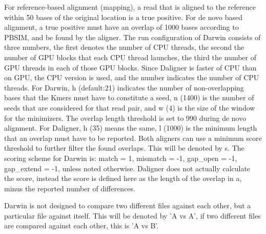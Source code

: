 \documentclass[../thesis.tex]{subfiles}
\begin{document}
For reference-based alignment (mapping), a read that is aligned to the reference within 50 bases of the original location is a true positive.
For de novo based alignment, a true positive must have an overlap of 1000 bases according to PBSIM, and be found by the aligner.
The run configuration of Darwin consists of three numbers, the first denotes the number of CPU threads, the second the number of GPU blocks that each CPU thread launches, the third the number of GPU threads in each of those GPU blocks.
Since Daligner is faster of CPU than on GPU, the CPU version is used, and the number indicates the number of CPU threads.
For Darwin, h (default:21) indicates the number of non-overlapping bases that the Kmers must have to constitute a seed, n (1400) is the number of seeds that are considered for that read pair, and w (4) is the size of the window for the minimizers.
The overlap length threshold is set to 990 during de novo alignment.
For Daligner, h (35) means the same, l (1000) is the minimum length that an overlap must have to be reported.
Both aligners can use a minimum score threshold to further filter the found overlaps.
This will be denoted by s.
The scoring scheme for Darwin is: match = 1, mismatch = -1, gap\_open = -1, gap\_extend = -1, unless noted otherwise.
Daligner does not actually calculate the score, instead the score is defined here as the length of the overlap in a, minus the reported number of differences.

Darwin is not designed to compare two different files against each other, but a particular file against itself.
This will be denoted by 'A vs A', if two different files are compared against each other, this is 'A vs B'.






\end{document}
